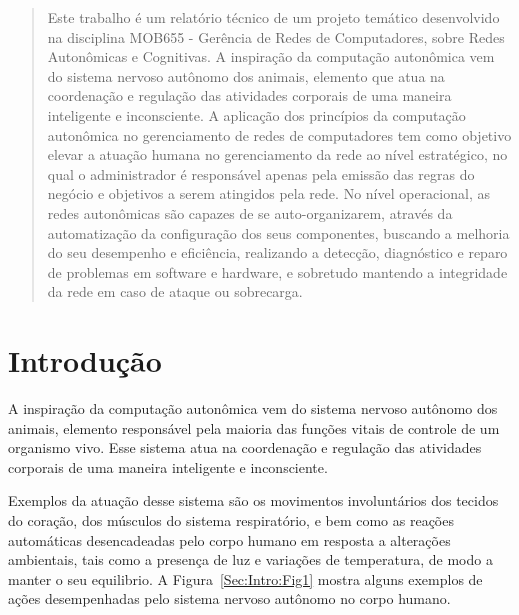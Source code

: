 \documentclass[11pt,twoside]{article}
\begin{document}
\begin{abstract} 
Este trabalho é um relatório técnico de um projeto temático desenvolvido na disciplina MOB655 - Gerência de Redes de Computadores, sobre Redes Autonômicas e Cognitivas.
A inspiração da computação autonômica vem do sistema nervoso autônomo dos animais, elemento que atua na coordenação e regulação das atividades corporais de uma maneira inteligente e inconsciente. A aplicação dos princípios da computação autonômica no gerenciamento de redes de computadores tem como objetivo elevar a atuação humana no gerenciamento da rede ao nível estratégico, no qual o administrador é responsável apenas pela emissão das regras do negócio e objetivos a serem atingidos pela rede. No nível operacional, as redes autonômicas são capazes de se auto-organizarem, através da automatização da configuração dos seus componentes, buscando a melhoria do seu desempenho e eficiência, realizando a detecção, diagnóstico e reparo de problemas em software e hardware, e sobretudo mantendo a integridade da rede em caso de ataque ou sobrecarga.

\end{abstract}

\section{Introdução}
A inspiração da computação autonômica vem do sistema nervoso autônomo dos animais, elemento responsável pela maioria das funções vitais de controle de um organismo vivo. Esse sistema atua na coordenação e regulação das atividades corporais de uma maneira inteligente e inconsciente. 

Exemplos da atuação desse sistema são os movimentos involuntários dos tecidos do coração, dos músculos do sistema respiratório, e bem como as reações automáticas desencadeadas pelo corpo humano em resposta a alterações ambientais, tais como a presença de luz e variações de temperatura, de modo a manter o seu equilibrio. A Figura~\ref{Sec:Intro:Fig1} mostra alguns exemplos de ações desempenhadas pelo sistema nervoso autônomo no corpo humano.
\end{document}
